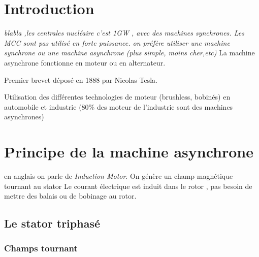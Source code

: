 \documentclass[main.tex]{subfiles}
\begin{document}
\section{Introduction}
\emph{blabla ,les centrales nucléaire c'est 1GW , avec des machines synchrones. Les MCC sont pas utilisé en forte puissance. on préfère utiliser une machine synchrone ou une machine asynchrone (plus simple, moins cher,etc)}
La machine asynchrone fonctionne en moteur ou en alternateur.

Premier brevet déposé en 1888 par Nicolas Tesla.

Utilisation des différentes technologies de moteur (brushless, bobinés) en automobile et industrie (80\% des moteur de l'industrie sont des machines asynchrones)


\section{Principe de la machine asynchrone}
en anglais on parle de \emph{Induction Motor}.
On génère un champ magnétique tournant au stator
Le courant électrique est induit dans le rotor , pas besoin de mettre des balais ou de bobinage au rotor.

\subsection{Le stator triphasé}
\subsubsection{Champs tournant}
\end{document}
